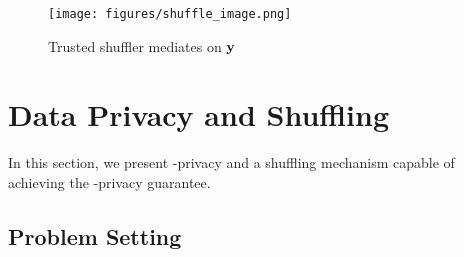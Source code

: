 \begin{wrapfigure}{r}{0.4\linewidth}
    \centering
    \texttt{[image: figures/shuffle\_image.png]} 
    \caption{\small{Trusted shuffler mediates on $\mathbf{y}$}} 
    \label{fig:problemsetting}
\end{wrapfigure}
\section{Data Privacy and Shuffling}\vspace{-0.2cm}
In this section, we present \name-privacy and a shuffling mechanism capable of achieving the \name-privacy guarantee. 
\vspace{-0.3cm}
\subsection{Problem Setting} \vspace{-0.1cm}

